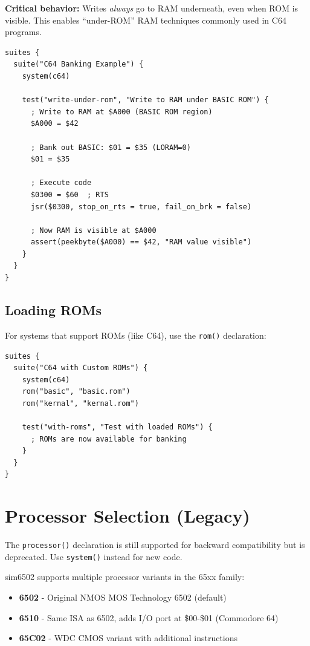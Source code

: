 \documentclass[11pt,letterpaper]{article}
\begin{document}
\textbf{Critical behavior:} Writes \emph{always} go to RAM underneath, even when ROM is visible. This enables ``under-ROM'' RAM techniques commonly used in C64 programs.

\begin{verbatim}
suites {
  suite("C64 Banking Example") {
    system(c64)

    test("write-under-rom", "Write to RAM under BASIC ROM") {
      ; Write to RAM at $A000 (BASIC ROM region)
      $A000 = $42

      ; Bank out BASIC: $01 = $35 (LORAM=0)
      $01 = $35

      ; Execute code
      $0300 = $60  ; RTS
      jsr($0300, stop_on_rts = true, fail_on_brk = false)

      ; Now RAM is visible at $A000
      assert(peekbyte($A000) == $42, "RAM value visible")
    }
  }
}
\end{verbatim}

\subsection{Loading ROMs}

For systems that support ROMs (like C64), use the \texttt{rom()} declaration:

\begin{verbatim}
suites {
  suite("C64 with Custom ROMs") {
    system(c64)
    rom("basic", "basic.rom")
    rom("kernal", "kernal.rom")

    test("with-roms", "Test with loaded ROMs") {
      ; ROMs are now available for banking
    }
  }
}
\end{verbatim}

\section{Processor Selection (Legacy)}

The \texttt{processor()} declaration is still supported for backward compatibility but is deprecated. Use \texttt{system()} instead for new code.

sim6502 supports multiple processor variants in the 65xx family:

\begin{itemize}
    \item \textbf{6502} - Original NMOS MOS Technology 6502 (default)
    \item \textbf{6510} - Same ISA as 6502, adds I/O port at \$00-\$01 (Commodore 64)
    \item \textbf{65C02} - WDC CMOS variant with additional instructions
\end{itemize}
\end{document}
